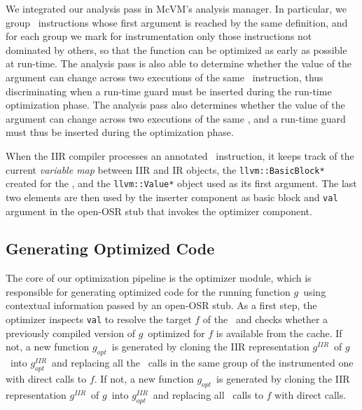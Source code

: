 We integrated our analysis pass in McVM's analysis manager. In particular, we group \feval\ instructions whose first argument is reached by the same definition, and for each group we mark for instrumentation only those instructions not dominated by others, so that the function can be optimized as early as possible at run-time. 
\ifdefined \fullver
The analysis pass is also able to determine whether the value of the argument can change across two executions of the same \feval\ instruction, thus discriminating when a run-time guard must be inserted during the run-time optimization phase.
\else
The analysis pass also determines whether the value of the argument can change across two executions of the same \feval, and a run-time guard must thus be inserted during the optimization phase.
\fi

When the IIR compiler processes an annotated \feval\ instruction, it keeps track of the current {\em variable map} between IIR and IR objects, the {\tt llvm::BasicBlock*} created for the \feval, and the {\tt llvm::Value*} object used as its first argument. The last two elements are then used by the inserter component as basic block and {\tt val} argument in the open-OSR stub that invokes the optimizer component.

\newcommand{\gBase}{$g$}
\newcommand{\gOpt}{$g_{opt}$}
\newcommand{\gIIR}{$g^{IIR}$}
\newcommand{\gIR}{$g^{IR}$}
\newcommand{\gOptIIR}{$g^{IIR}_{opt}$}
\newcommand{\gOptIR}{$g^{IR}_{opt}$}

\subsection{Generating Optimized Code}
\label{sse:optimizing_feval}
The core of our optimization pipeline is the optimizer module, which is responsible for generating optimized code for the running function \gBase\ using contextual information passed by an open-OSR stub. As a first step, the optimizer inspects {\tt val} to resolve the target $f$ of the \feval\ and checks whether a previously compiled version of \gBase\ optimized for $f$ is available from the cache.
\ifdefined \fullver
If not, a new function \gOpt\ is generated by cloning the IIR representation \gIIR\ of \gBase\ into \gOptIIR\ and replacing all the \feval\ calls in the same group of the instrumented one with direct calls to $f$.
\else
If not, a new function \gOpt\ is generated by cloning the IIR representation \gIIR\ of \gBase\ into \gOptIIR\ and replacing all \feval\ calls to $f$ with direct calls.
\fi

